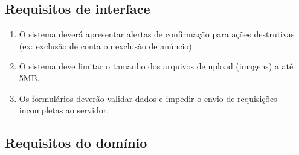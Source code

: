 ﻿\documentclass[12pt,a4paper]{article}
\begin{document}
\subsection{Requisitos de interface}
\label{sec:RequisitosInterface}

\begin{enumerate}[label=RI\arabic*:]

    \item O sistema deverá apresentar alertas de confirmação para ações destrutivas (ex: exclusão de conta ou exclusão de anúncio).

    \item O sistema deve limitar o tamanho dos arquivos de upload (imagens) a até 5MB.

    \item Os formulários deverão validar dados e impedir o envio de requisições incompletas ao servidor.

\end{enumerate}

\subsection{Requisitos do domínio}
\label{sec:RequisitosDominio}
\end{document}
